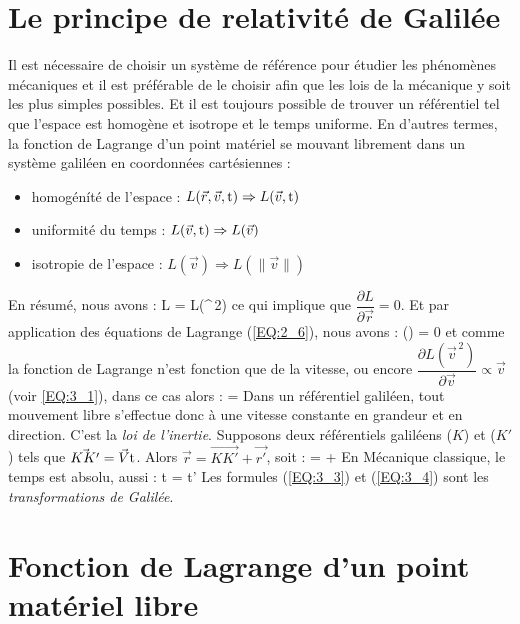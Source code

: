 \section{Le principe de relativit\'e de Galil\'ee}

Il est n\'ecessaire de choisir un syst\`eme de r\'ef\'erence pour \'etudier les ph\'enom\`enes m\'ecaniques et il est pr\'ef\'erable de le choisir afin que les lois de la m\'ecanique y soit les plus simples possibles. Et il est toujours possible de trouver un r\'ef\'erentiel tel que l'espace est homog\`ene et isotrope et le temps uniforme. En d'autres termes, la fonction de Lagrange d'un point mat\'eriel se mouvant librement dans un syst\`eme galil\'een en coordonn\'ees cart\'esiennes :
\begin{itemize}
	\item homog\'en\'it\'e de l'espace : $L(\vec{r},\vec{v},{\rm t}) \Rightarrow L(\vec{v},{\rm t})$
	\item uniformit\'e du temps : $L(\vec{v},{\rm t}) \Rightarrow L(\vec{v})$
	\item isotropie de l'espace : $L(\vec{v}) \Rightarrow L(\lVert\vec{v}\rVert)$
\end{itemize}
En r\'esum\'e, nous avons :
\be
	L = L(^{\,2}) \label{EQ:3_1}
\ee
ce qui implique que $\dfrac{\partial L}{\partial \vec{r}} = 0$. Et par application des \'equations de Lagrange (\ref{EQ:2_6}), nous avons :
\be
	\left(\right) = 0
\ee
et comme la fonction de Lagrange n'est fonction que de la vitesse, ou encore $\dfrac{\partial L({\vec{v}}^{\,2})}{\partial \vec{v}} \propto \vec{v}$ (voir \ref{EQ:3_1}), dans ce cas alors :
\be
	 =  \label{EQ:3_2}
\ee
Dans un r\'ef\'erentiel galil\'een, tout mouvement libre s'effectue donc \`a une vitesse constante en grandeur et en direction. C'est la \emph{loi de l'inertie}. Supposons deux r\'ef\'erentiels galil\'eens ($K$) et ($K'$) tels que $\vec{KK'}=\vec{V}{\rm t}$. Alors $\vec{r}=\vec{KK'}+\vec{r'}$, soit :
\be
	 =  +  \label{EQ:3_3}
\ee
En M\'ecanique classique, le temps est absolu, aussi :
\be
	{\rm t} = {\rm t'} \label{EQ:3_4}
\ee
Les formules (\ref{EQ:3_3}) et (\ref{EQ:3_4}) sont les \emph{transformations de Galil\'ee}.

\section{Fonction de Lagrange d'un point mat\'eriel libre}

